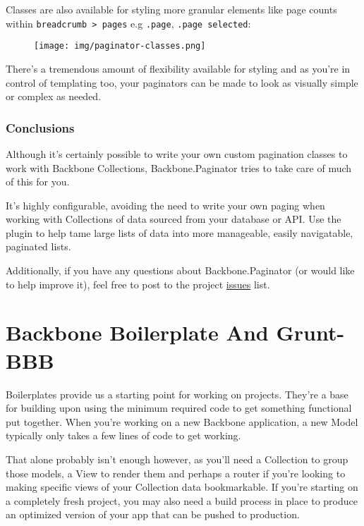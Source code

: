 \documentclass[9pt]{book}
\begin{document}
Classes are also available for styling more granular elements like page
counts within \texttt{breadcrumb \textgreater{} pages} e.g
\texttt{.page}, \texttt{.page selected}:

\begin{figure}[htbp]
\centering
\texttt{[image: img/paginator-classes.png]}
\end{figure}

There's a tremendous amount of flexibility available for styling and as
you're in control of templating too, your paginators can be made to look
as visually simple or complex as needed.

\subsubsection{Conclusions}\label{conclusions}

Although it's certainly possible to write your own custom pagination
classes to work with Backbone Collections, Backbone.Paginator tries to
take care of much of this for you.

It's highly configurable, avoiding the need to write your own paging
when working with Collections of data sourced from your database or API.
Use the plugin to help tame large lists of data into more manageable,
easily navigatable, paginated lists.

Additionally, if you have any questions about Backbone.Paginator (or
would like to help improve it), feel free to post to the project
\href{https://github.com/addyosmani/backbone.paginator}{issues} list.

\section{Backbone Boilerplate And
Grunt-BBB}\label{backbone-boilerplate-and-grunt-bbb}

Boilerplates provide us a starting point for working on projects.
They're a base for building upon using the minimum required code to get
something functional put together. When you're working on a new Backbone
application, a new Model typically only takes a few lines of code to get
working.

That alone probably isn't enough however, as you'll need a Collection to
group those models, a View to render them and perhaps a router if you're
looking to making specific views of your Collection data bookmarkable.
If you're starting on a completely fresh project, you may also need a
build process in place to produce an optimized version of your app that
can be pushed to production.
\end{document}
